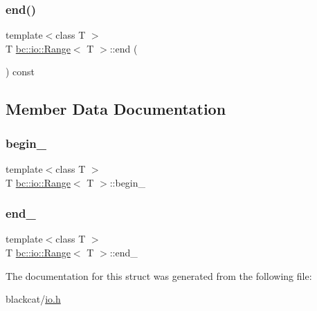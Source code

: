 \mbox{\label{structbc_1_1io_1_1Range_a05327555759f7e2adcb5c7878a0733e1}} 
\subsubsection{\texorpdfstring{end()}{end()}}
{\footnotesize\ttfamily template$<$class T $>$ \\
T \hyperlink{structbc_1_1io_1_1Range}{bc\+::io\+::\+Range}$<$ T $>$\+::end (\begin{DoxyParamCaption}{ }\end{DoxyParamCaption}) const\hspace{0.3cm}{\ttfamily [inline]}}



\subsection{Member Data Documentation}
\mbox{\label{structbc_1_1io_1_1Range_aec9c4435bef83dc46adb59289ffafc0b}} 
\subsubsection{\texorpdfstring{begin\+\_\+}{begin\_}}
{\footnotesize\ttfamily template$<$class T $>$ \\
T \hyperlink{structbc_1_1io_1_1Range}{bc\+::io\+::\+Range}$<$ T $>$\+::begin\+\_\+}

\mbox{\label{structbc_1_1io_1_1Range_abe3c74187db600a531a5bbb3e213625d}} 
\subsubsection{\texorpdfstring{end\+\_\+}{end\_}}
{\footnotesize\ttfamily template$<$class T $>$ \\
T \hyperlink{structbc_1_1io_1_1Range}{bc\+::io\+::\+Range}$<$ T $>$\+::end\+\_\+}



The documentation for this struct was generated from the following file\+:\begin{DoxyCompactItemize}
\item 
blackcat/\hyperlink{io_8h}{io.\+h}\end{DoxyCompactItemize}
